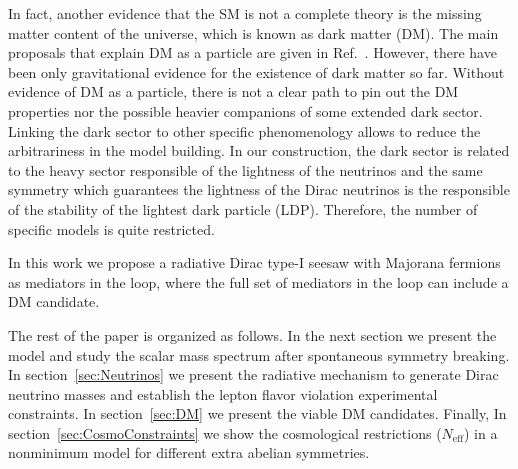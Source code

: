 \documentclass[12pt]{article}
\begin{document}
In fact, another evidence that the SM is not a complete theory is the
missing matter content of the universe, which is known as dark matter
(DM).
The main proposals that explain DM as a particle are given in
Ref.~\cite{Bertone:2004pz}.
However, there have been only gravitational evidence for the existence
of dark matter so far.
Without evidence of DM as a particle, there is not a clear path to pin
out the DM properties nor the possible heavier companions of some
extended dark sector. 
Linking the dark sector to other specific phenomenology allows to
reduce the arbitrariness in the model building.
In our construction, the dark sector is related to the heavy sector
responsible of the lightness of the neutrinos and the same symmetry
which guarantees the lightness of the Dirac neutrinos is the
responsible of the stability of the lightest dark particle (LDP).
Therefore, the number of specific models is quite restricted.

In this work we propose a radiative Dirac type-I seesaw with Majorana
fermions as mediators in the loop, where the full set of mediators in the
loop can include a DM candidate.

The rest of the paper is organized as follows. In the next section we present the model and study the scalar mass spectrum after spontaneous symmetry breaking. In section~\ref{sec:Neutrinos} we present the radiative mechanism to generate Dirac neutrino masses and establish  the lepton flavor violation experimental constraints. In section~\ref{sec:DM} we present the viable DM candidates. Finally, In section~\ref{sec:CosmoConstraints} we show the cosmological restrictions ($N_{\text{eff}}$) in a nonminimum model for different extra abelian symmetries.
\end{document}
